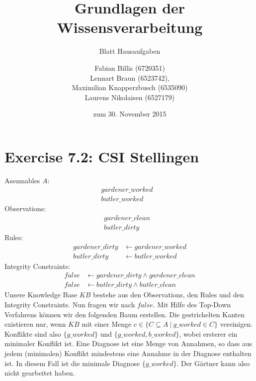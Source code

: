 \documentclass[a4paper]{scrartcl}
\title{Grundlagen der Wissensverarbeitung}
\subtitle{Blatt {\blattnr} Hausaufgaben}
\author{
    Fabian Billis (6720351) \\
    Lennart Braun (6523742), \\
    Maximilian Knapperzbusch (6535090) \\
    Laurens Nikolaisen (6527179) \\
}
\date{zum 30. November 2015}
\def \blattnr {7}
\begin{document}
\maketitle

\section*{Exercise \blattnr.2: CSI Stellingen}

Assumables $A$:
\begin{align*}
    gardener\_worked & \\
    butler\_worked &
\end{align*}
Observations:
\begin{align*}
    gardener\_clean & \\
    butler\_dirty &
\end{align*}
Rules:
\begin{align*}
    gardener\_dirty &\leftarrow gardener\_worked \\
    butler\_dirty &\leftarrow butler\_worked
\end{align*}
Integrity Constraints:
\begin{align*}
    false &\leftarrow gardener\_dirty \land gardener\_clean \\
    false &\leftarrow butler\_dirty \land butler\_clean
\end{align*}
Unsere Knowledge Base $KB$ bestehe aus den Observations, den Rules und den
Integrity Constraints.  Nun fragen wir nach $false$.  Mit Hilfe des Top-Down
Verfahrens können wir den folgenden Baum erstellen.  Die gestrichelten Kanten
existieren nur, wenn $KB$ mit einer Menge $c \in \{ C \subseteq A \ |\
g\_worked \in C\}$ vereinigen. Konflikte sind also $\{g\_worked\}$ und
$\{g\_worked, b\_worked\}$, wobei ersterer ein minimaler Konflikt ist.  Eine
Diagnose ist eine Menge von Annahmen, so dass aus jedem (minimalen) Konflikt
mindestens eine Annahme in der Diagnose enthalten ist. In diesem Fall ist die
minimale Diagnose $\{g\_worked\}$. Der Gärtner kann also nicht gearbeitet
haben.
\end{document}
